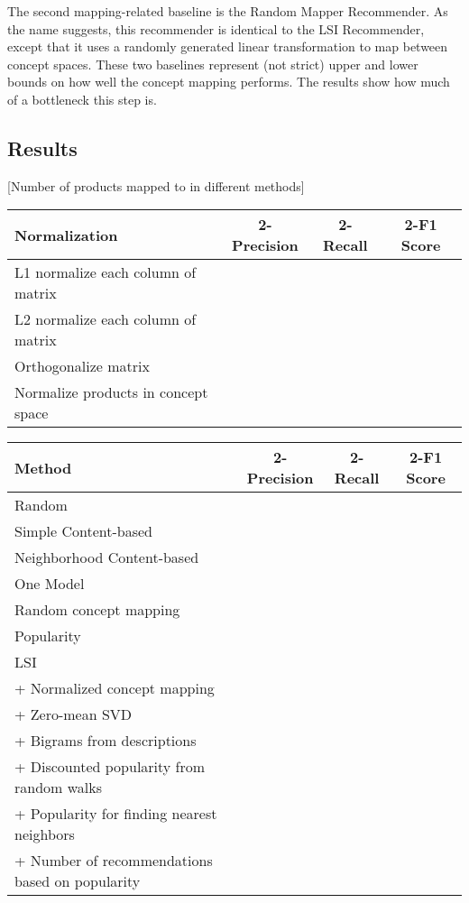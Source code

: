 \documentclass[11pt]{article}
\begin{document}
The second mapping-related baseline is the Random Mapper Recommender. As the
name suggests, this recommender is identical to the LSI Recommender, except that
it uses a randomly generated linear transformation to map between concept
spaces. These two baselines represent (not strict) upper and lower bounds on how
well the concept mapping performs. The results show how much of a bottleneck
this step is.

\subsection*{Results}
[Number of products mapped to in different methods]
\begin{center}
\begin{tabular}{ | l | c | c | c |}
\hline
Normalization & 2-Precision & 2-Recall & 2-F1 Score \\ \hline\hline
L1 normalize each column of matrix &&&\\ \hline
L2 normalize each column of matrix &&&\\ \hline
Orthogonalize matrix &&&\\ \hline
Normalize products in concept space &&&\\ \hline
\end{tabular}
\end{center}

\begin{center}
\begin{tabular}{ | l | c | c | c |}
\hline
Method & 2-Precision & 2-Recall & 2-F1 Score \\ \hline\hline
Random &&&\\ \hline
Simple Content-based &&&\\ \hline
Neighborhood Content-based &&&\\ \hline
One Model &&&\\ \hline
Random concept mapping &&&\\ \hline
Popularity &&&\\ \hline
LSI &&&\\ \hline
\hspace*{0.5cm} + Normalized concept mapping &&&\\ \hline
\hspace*{0.5cm} + Zero-mean SVD &&&\\ \hline
\hspace*{0.5cm} + Bigrams from descriptions &&&\\ \hline
\hspace*{0.5cm} + Discounted popularity from random walks &&&\\ \hline
\hspace*{0.5cm} + Popularity for finding nearest neighbors &&&\\ \hline
\hspace*{0.5cm} + Number of recommendations based on popularity &&&\\ \hline

\end{tabular}
\end{center}
\end{document}
